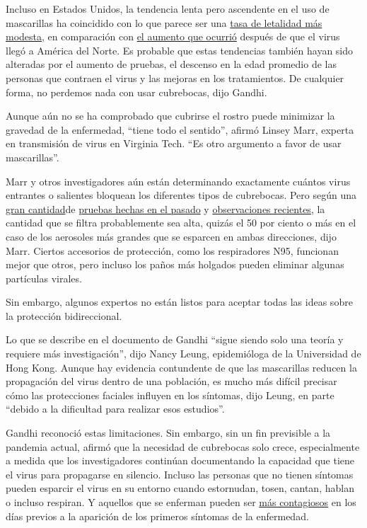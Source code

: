 Incluso en Estados Unidos, la tendencia lenta pero ascendente en el uso
de mascarillas ha coincidido con lo que parece ser una
\href{https://www.nytimes3xbfgragh.onion/2020/07/03/health/coronavirus-mortality-testing.html}{tasa
de letalidad más modesta}, en comparación con
\href{https://www.nytimes3xbfgragh.onion/es/interactive/2020/espanol/mundo/coronavirus-en-estados-unidos.html}{el
aumento que ocurrió} después de que el virus llegó a América del Norte.
Es probable que estas tendencias también hayan sido alteradas por el
aumento de pruebas, el descenso en la edad promedio de las personas que
contraen el virus y las mejoras en los tratamientos. De cualquier forma,
no perdemos nada con usar cubrebocas, dijo Gandhi.

Aunque aún no se ha comprobado que cubrirse el rostro puede minimizar la
gravedad de la enfermedad, ``tiene todo el sentido'', afirmó Linsey
Marr, experta en transmisión de virus en Virginia Tech. ``Es otro
argumento a favor de usar mascarillas''.

Marr y otros investigadores aún están determinando exactamente cuántos
virus entrantes o salientes bloquean los diferentes tipos de cubrebocas.
Pero según una
\href{https://journals.plos.org/plosone/article?id=10.1371/journal.pone.0002618}{gran
cantidad}de
\href{https://www.nature.com/articles/s41591-020-0843-2}{pruebas hechas
en el pasado} y
\href{https://www.thelancet.com/journals/lancet/article/PIIS0140-6736(20)31142-9/fulltext\#\%20}{observaciones
recientes}, la cantidad que se filtra probablemente sea alta, quizás el
50 por ciento o más en el caso de los aerosoles más grandes que se
esparcen en ambas direcciones, dijo Marr. Ciertos accesorios de
protección, como los respiradores N95, funcionan mejor que otros, pero
incluso los paños más holgados pueden eliminar algunas partículas
virales.

Sin embargo, algunos expertos no están listos para aceptar todas las
ideas sobre la protección bidireccional.

Lo que se describe en el documento de Gandhi ``sigue siendo solo una
teoría y requiere más investigación'', dijo Nancy Leung, epidemióloga de
la Universidad de Hong Kong. Aunque hay evidencia contundente de que las
mascarillas reducen la propagación del virus dentro de una población, es
mucho más difícil precisar cómo las protecciones faciales influyen en
los síntomas, dijo Leung, en parte ``debido a la dificultad para
realizar esos estudios''.

Gandhi reconoció estas limitaciones. Sin embargo, sin un fin previsible
a la pandemia actual, afirmó que la necesidad de cubrebocas solo crece,
especialmente a medida que los investigadores continúan documentando la
capacidad que tiene el virus para propagarse en silencio. Incluso las
personas que no tienen síntomas pueden esparcir el virus en su entorno
cuando estornudan, tosen, cantan, hablan o incluso respiran. Y aquellos
que se enferman pueden ser
\href{https://www.nature.com/articles/s41591-020-0869-5}{más
contagiosos} en los días previos a la aparición de los primeros síntomas
de la enfermedad.

